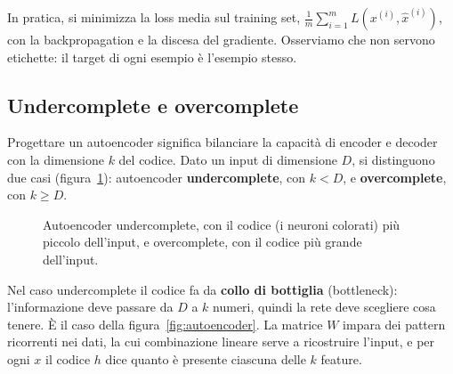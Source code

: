 In pratica, si minimizza la loss media sul training set, $\frac{1}{m}\sum_{i=1}^{m} L(x^{(i)}, \hat{x}^{(i)})$, con la backpropagation e la discesa del gradiente. Osserviamo che non servono etichette: il target di ogni esempio è l'esempio stesso.

\subsection{Undercomplete e overcomplete}\label{sec:under-over}
Progettare un autoencoder significa bilanciare la capacità di encoder e decoder con la dimensione $k$ del codice. Dato un input di dimensione $D$, si distinguono due casi (figura~\ref{fig:under-over}): autoencoder \textbf{undercomplete}, con $k < D$, e \textbf{overcomplete}, con $k \geq D$.

\begin{figure}[htbp]
\centering
{}
\caption{Autoencoder undercomplete, con il codice (i neuroni colorati) più piccolo dell'input, e overcomplete, con il codice più grande dell'input.}
\label{fig:under-over}
\end{figure}

Nel caso undercomplete il codice fa da \textbf{collo di bottiglia} (bottleneck): l'informazione deve passare da $D$ a $k$ numeri, quindi la rete deve scegliere cosa tenere. È il caso della figura~\ref{fig:autoencoder}. La matrice $W$ impara dei pattern ricorrenti nei dati, la cui combinazione lineare serve a ricostruire l'input, e per ogni $x$ il codice $h$ dice quanto è presente ciascuna delle $k$ feature.

